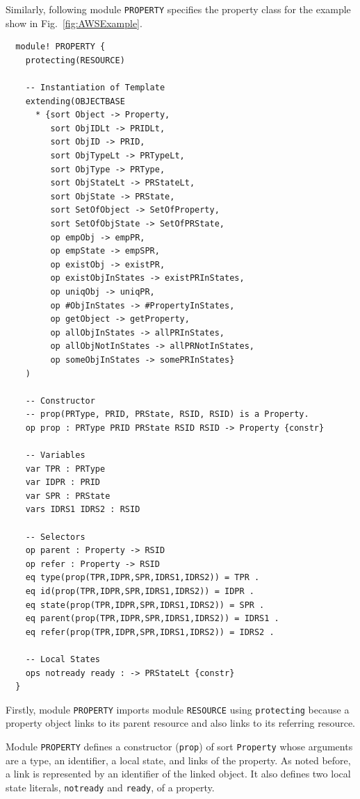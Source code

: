 \documentclass[12pt]{report}
\begin{document}
Similarly, following module {\tt PROPERTY} specifies the property class 
for the example show in Fig.~\ref{fig:AWSExample}.
\small
\begin{verbatim}
  module! PROPERTY {
    protecting(RESOURCE)
  
    -- Instantiation of Template
    extending(OBJECTBASE
      * {sort Object -> Property,
         sort ObjIDLt -> PRIDLt,
         sort ObjID -> PRID,
         sort ObjTypeLt -> PRTypeLt,
         sort ObjType -> PRType,
         sort ObjStateLt -> PRStateLt,
         sort ObjState -> PRState,
         sort SetOfObject -> SetOfProperty,
         sort SetOfObjState -> SetOfPRState,
         op empObj -> empPR,
         op empState -> empSPR,
         op existObj -> existPR,
         op existObjInStates -> existPRInStates,
         op uniqObj -> uniqPR,
         op #ObjInStates -> #PropertyInStates,
         op getObject -> getProperty,
         op allObjInStates -> allPRInStates,
         op allObjNotInStates -> allPRNotInStates,
         op someObjInStates -> somePRInStates}
    )
  
    -- Constructor
    -- prop(PRType, PRID, PRState, RSID, RSID) is a Property.
    op prop : PRType PRID PRState RSID RSID -> Property {constr}
  
    -- Variables
    var TPR : PRType
    var IDPR : PRID
    var SPR : PRState
    vars IDRS1 IDRS2 : RSID
  
    -- Selectors
    op parent : Property -> RSID
    op refer : Property -> RSID
    eq type(prop(TPR,IDPR,SPR,IDRS1,IDRS2)) = TPR .
    eq id(prop(TPR,IDPR,SPR,IDRS1,IDRS2)) = IDPR .
    eq state(prop(TPR,IDPR,SPR,IDRS1,IDRS2)) = SPR .
    eq parent(prop(TPR,IDPR,SPR,IDRS1,IDRS2)) = IDRS1 .
    eq refer(prop(TPR,IDPR,SPR,IDRS1,IDRS2)) = IDRS2 .
  
    -- Local States
    ops notready ready : -> PRStateLt {constr}
  }
\end{verbatim}
\normalsize
Firstly, module {\tt PROPERTY} imports module {\tt RESOURCE} using
{\tt protecting} because a property object links to its parent
resource and also links to its referring resource.

Module {\tt PROPERTY} defines a constructor ({\tt prop}) of sort
{\tt Property} whose arguments are a type, an identifier, a local
state, and links of the property. As noted before, a link is
represented by an identifier of the linked object.  It also defines
two local state literals, {\tt notready} and {\tt ready}, of a property.
\end{document}
